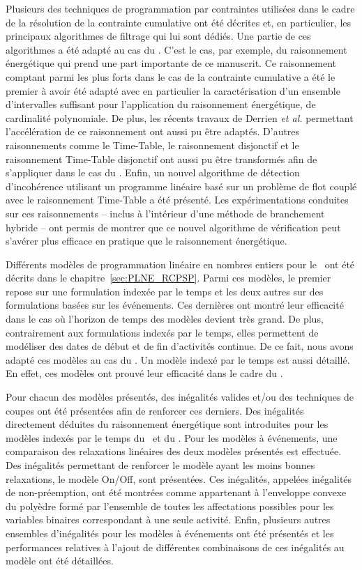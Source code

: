 Plusieurs des techniques de programmation par contraintes utilisées dans le
cadre de la résolution de la contrainte cumulative ont été décrites et, en
particulier, les principaux algorithmes de filtrage qui lui sont
dédiés. Une partie de ces algorithmes a été adapté au cas du
\CECSP. C'est le cas, par exemple, du raisonnement énergétique qui
prend une part importante de ce manuscrit. Ce raisonnement comptant
parmi les plus forts dans le cas de la contrainte cumulative a été le
premier à avoir été adapté  avec en particulier la caractérisation
d'un ensemble d'intervalles suffisant pour l'application du
raisonnement énergétique, de
cardinalité polynomiale. De plus, les récents travaux de Derrien
{\it et al.} permettant l'accélération de ce raisonnement ont aussi pu
être adaptés. D'autres raisonnements comme le Time-Table, le
raisonnement disjonctif et le raisonnement Time-Table disjonctif ont
aussi pu être transformés afin de s'appliquer dans le cas du
\CECSP. Enfin, un nouvel algorithme de détection d'incohérence
utilisant un programme linéaire basé sur un problème de flot couplé
avec le raisonnement Time-Table a été présenté. Les expérimentations
conduites sur ces raisonnements -- inclus à l'intérieur d'une méthode
de branchement hybride -- ont permis de montrer que ce nouvel
algorithme de vérification peut s'avérer plus efficace en pratique que
le raisonnement énergétique.

Différents modèles de programmation linéaire en nombres entiers pour le
\RCPSP~ont été décrits dans le chapitre~\ref{sec:PLNE_RCPSP}. Parmi
ces modèles, le premier repose sur une formulation indexée par le temps
et les deux autres sur des formulations basées sur les événements. Ces
dernières ont montré leur efficacité dans le cas où l'horizon de temps
des modèles devient très grand. De plus, contrairement aux
formulations 
indexés par le temps, elles permettent de modéliser des dates de début
et de fin d'activités continue. De ce fait, nous avons adapté ces
modèles au cas du \CECSP. Un modèle indexé par le temps est aussi
détaillé. En effet, ces modèles ont prouvé leur efficacité dans le
cadre du \RCPSP.

Pour chacun des modèles présentés, des inégalités valides et/ou des
techniques de coupes ont été présentées afin de renforcer ces
derniers. Des inégalités directement déduites du raisonnement
énergétique sont introduites pour les modèles indexés par le temps du
\CECSP~et du \RCPSP. Pour les modèles à événements, une comparaison
des relaxations linéaires des deux modèles présentés est
effectuée. Des inégalités permettant de renforcer le modèle ayant les
moins bonnes relaxations, le modèle On/Off, sont présentées. Ces
inégalités, appelées inégalités de non-préemption, ont été montrées 
comme appartenant à l'enveloppe convexe du polyèdre formé par
l’ensemble de toutes les affectations possibles pour les variables
binaires correspondant à une seule activité. Enfin, plusieurs autres
ensembles d'inégalités pour les modèles à événements ont été présentés
et les performances relatives à l'ajout de différentes combinaisons de
ces inégalités au modèle ont été détaillées. 

